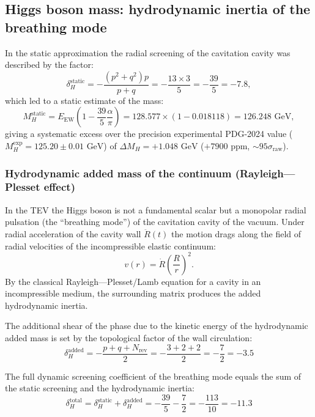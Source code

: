 \documentclass[11pt,a4paper]{article}
\theoremstyle{definition}
\theoremstyle{remark}
\begin{document}
\subsection{Higgs boson mass: hydrodynamic inertia of the breathing mode}
\label{subsec:higgs_breathing_resolution}

In the static approximation the radial screening of the cavitation cavity was described by the factor:
\begin{equation}
\delta_H^{\mathrm{static}} = -\frac{(p^2 + q^2) p}{p + q} = -\frac{13 \times 3}{5} = -\frac{39}{5} = -7.8,
\end{equation}
which led to a static estimate of the mass:
\begin{equation}
M_H^{\mathrm{static}} = E_{\mathrm{EW}} \left(1 - \frac{39}{5} \frac{\alpha}{\pi}\right) = 128.577 \times (1 - 0.018118) = 126.248 \text{ GeV},
\end{equation}
giving a systematic excess over the precision experimental PDG-2024 value ($M_H^{\mathrm{exp}} = 125.20 \pm 0.01\text{ GeV}$) of $\Delta M_H = +1.048\text{ GeV}$ ($+7900\text{ ppm}$, $\sim 95\sigma_{\mathrm{raw}}$).

\subsubsection{Hydrodynamic added mass of the continuum (Rayleigh---Plesset effect)}

In the TEV the Higgs boson is not a fundamental scalar but a monopolar radial pulsation (the ``breathing mode'') of the cavitation cavity of the vacuum. Under radial acceleration of the cavity wall $\ddot{R}(t)$ the motion drags along the field of radial velocities of the incompressible elastic continuum:
\begin{equation}
v(r) = \dot{R} \left(\frac{R}{r}\right)^2.
\end{equation}
By the classical Rayleigh---Plesset/Lamb equation for a cavity in an incompressible medium, the surrounding matrix produces the added hydrodynamic inertia.

The additional shear of the phase due to the kinetic energy of the hydrodynamic added mass is set by the topological factor of the wall circulation:
\begin{equation}
\delta_H^{\mathrm{added}} = -\frac{p + q + N_{\mathrm{rev}}}{2} = -\frac{3 + 2 + 2}{2} = -\frac{7}{2} = -3.5
\end{equation}

The full dynamic screening coefficient of the breathing mode equals the sum of the static screening and the hydrodynamic inertia:
\begin{equation}
\delta_H^{\mathrm{total}} = \delta_H^{\mathrm{static}} + \delta_H^{\mathrm{added}} = -\frac{39}{5} - \frac{7}{2} = -\frac{113}{10} = -11.3
\end{equation}
\end{document}
